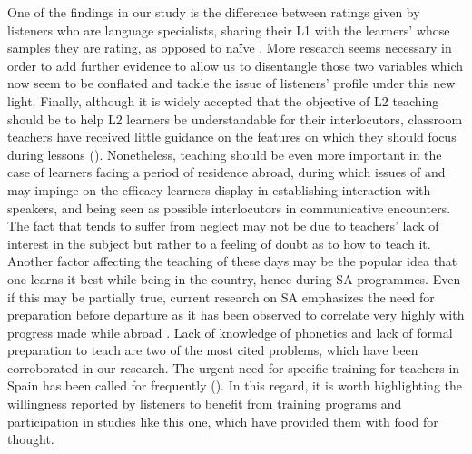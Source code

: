 \documentclass[output=paper]{langsci/langscibook}
\begin{document}
One of the findings in our study is the difference between ratings given by listeners who are language specialists, sharing their {L1} with the learners’ whose samples they are rating, as opposed to naïve . More research seems necessary in order to add further evidence to allow us to disentangle those two variables which now seem to be conflated and tackle the issue of listeners’ profile under this new light. Finally, although it is widely accepted that the objective of {L2}  teaching should be to help {L2} learners be understandable for their interlocutors, classroom teachers have received little guidance on the  features on which they should focus during lessons (\citealt{DerwingMunro2009}). Nonetheless, teaching  should be even more important in the case of  learners facing a period of residence abroad, during which issues of  and  may impinge on the efficacy learners display in establishing interaction with  speakers, and being seen as possible interlocutors in communicative encounters. The fact that  tends to suffer from neglect may not be due to teachers’ lack of interest in the subject but rather to a feeling of doubt as to how to teach it. Another factor affecting the teaching of  these days may be the popular idea that one learns it best while being in the  country, hence during SA programmes. Even if this may be partially true, current research on SA emphasizes the need for preparation before departure as it has been observed to correlate very highly with progress made while abroad \citep{PaigeEtAl2002}. Lack of knowledge of phonetics and lack of formal preparation to teach  are two of the most cited problems, which have been corroborated in our research. The urgent need for specific  training for teachers in Spain has been called for frequently (\citealt{Levey1999,Levey2001,Donovan2001,Pavón2001,PavónRosado2003}). In this regard, it is worth highlighting the willingness reported by listeners to benefit from  training programs and participation in studies like this one, which have provided them with food for thought. 
\end{document}
